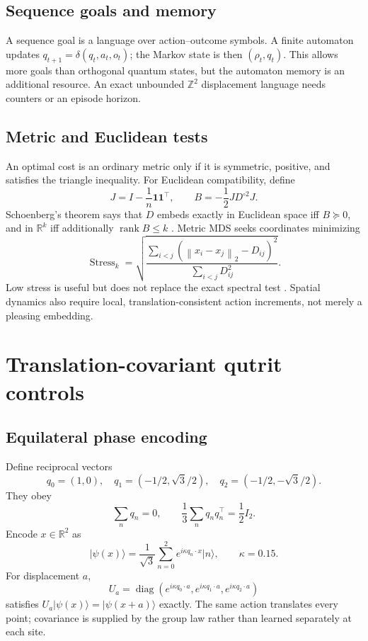 \documentclass[11pt]{article}
\theoremstyle{definition}\newtheorem{definition}[theorem]{Definition}
\theoremstyle{remark}\newtheorem{remark}[theorem]{Remark}
\newcommand{\R}{\mathbb R}
\newcommand{\Z}{\mathbb Z}
\newcommand{\rank}{\operatorname{rank}}
\newcommand{\ket}[1]{\lvert #1\rangle}
\newcommand{\norm}[1]{\left\lVert #1\right\rVert}
\begin{document}
\subsection{Sequence goals and memory}

A sequence goal is a language over action--outcome symbols. A finite automaton
updates \(q_{t+1}=\delta(q_t,a_t,o_t)\); the Markov state is then
\((\rho_t,q_t)\). This allows more goals than orthogonal quantum states, but
the automaton memory is an additional resource. An exact unbounded
\(\Z^2\) displacement language needs counters or an episode horizon.

\subsection{Metric and Euclidean tests}

An optimal cost is an ordinary metric only if it is symmetric, positive, and
satisfies the triangle inequality. For Euclidean compatibility, define
\begin{equation}
J=I-\frac1n\bm1\bm1^\top,\qquad
B=-\frac12JD^{\circ2}J.
\label{eq:schoenberg}
\end{equation}
Schoenberg's theorem says that \(D\) embeds exactly in Euclidean space iff
\(B\succeq0\), and in \(\R^k\) iff additionally
\(\rank B\le k\) \cite{schoenberg1935,borg2005}.
Metric MDS seeks coordinates minimizing
\begin{equation}
\operatorname{Stress}_k=
\sqrt{\frac{\sum_{i<j}(\norm{x_i-x_j}_2-D_{ij})^2}
{\sum_{i<j}D_{ij}^2}}.
\label{eq:stress}
\end{equation}
Low stress is useful but does not replace the exact spectral test
\cite{kruskal1964}. Spatial dynamics also require local, translation-consistent
action increments, not merely a pleasing embedding.

\section{Translation-covariant qutrit controls}
\label{sec:qutrit}

\subsection{Equilateral phase encoding}

Define reciprocal vectors
\begin{equation}
q_0=(1,0),\quad
q_1=(-1/2,\sqrt3/2),\quad
q_2=(-1/2,-\sqrt3/2).
\end{equation}
They obey
\[
\sum_nq_n=0,\qquad \frac13\sum_nq_nq_n^\top=\frac12I_2.
\]
Encode \(x\in\R^2\) as
\begin{equation}
\ket{\psi(x)}=\frac1{\sqrt3}\sum_{n=0}^2
e^{i\kappa q_n\cdot x}\ket n,\qquad \kappa=0.15.
\label{eq:phase-encoding}
\end{equation}
For displacement \(a\),
\begin{equation}
U_a=\operatorname{diag}\left(
e^{i\kappa q_0\cdot a},e^{i\kappa q_1\cdot a},
e^{i\kappa q_2\cdot a}\right)
\end{equation}
satisfies \(U_a\ket{\psi(x)}=\ket{\psi(x+a)}\) exactly. The same action
translates every point; covariance is supplied by the group law rather than
learned separately at each site.
\end{document}
